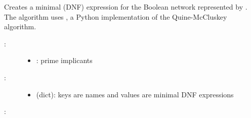 \documentclass[letterpaper,10pt,english]{sphinxmanual}
\begin{document}
\begin{fulllineitems}
\label{\detokenize{QuineMcCluskey:PyBoolNet.QuineMcCluskey.primes2mindnf}}
Creates a minimal  (DNF) expression for the Boolean network represented by .
The algorithm uses {\hyperref[\detokenize{Bibliography:prekas2012}]{}}, a Python implementation of the Quine-McCluskey algorithm.
\begin{description}
\item[{:}] \leavevmode\begin{itemize}
\item {} 
: prime implicants

\end{itemize}

\item[{:}] \leavevmode\begin{itemize}
\item {} 
 (dict): keys are names and values are minimal DNF expressions

\end{itemize}

\end{description}

:

\begin{sphinxVerbatim}[commandchars=\\\{\}]
\PYG{p}{[}\PYG{p}{]}\PYG{p}{[}\PYG{p}{]}
  
\PYG{p}{[}\PYG{p}{]}
\end{sphinxVerbatim}

\end{fulllineitems}
\end{document}
